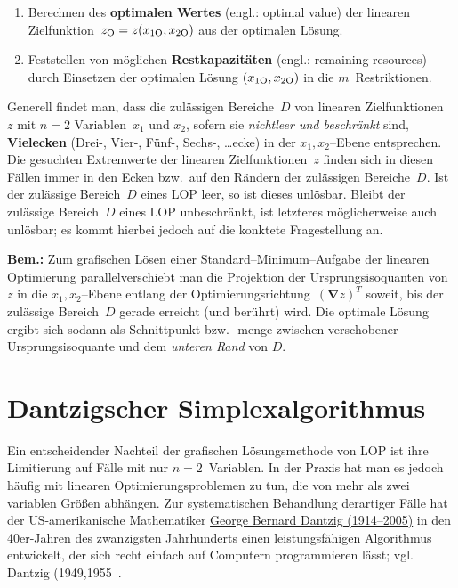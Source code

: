 \begin{enumerate}
\item Berechnen des {\bf optimalen Wertes} (engl.: optimal value) 
der linearen Zielfunktion~$z_{{\rm O}}=z(x_{1{\rm O}},x_{2{\rm O}})$ aus der optimalen L\"osung.

\item Feststellen von m\"oglichen {\bf Restkapazit\"aten} (engl.: 
remaining resources) durch Einsetzen der optimalen L\"osung 
$(x_{1{\rm O}}, x_{2{\rm O}})$ in die $m$~Restriktionen.

\end{enumerate}
%
Generell findet man, dass die zul\"assigen Bereiche~$D$ von
linearen Zielfunktionen~$z$ mit $n=2$ Variablen~$x_{1}$ und
$x_{2}$, sofern sie {\em nichtleer und beschr\"ankt\/} sind,
{\bf Vielecken} (Drei-, Vier-, F\"unf-, Sechs-,
\ldots ecke) in der $x_{1},x_{2}$--Ebene entsprechen. Die
gesuchten Extremwerte der linearen Zielfunktionen~$z$ finden
sich in diesen F\"allen immer in den Ecken bzw.\ auf den
R\"andern der zul\"assigen Bereiche~$D$. Ist der zul\"assige
Bereich~$D$ eines LOP leer, so ist dieses unl\"osbar.
Bleibt der zul\"assige Bereich~$D$ eines LOP unbeschr\"ankt,
ist letzteres m\"oglicherweise auch unl\"osbar; es kommt
hierbei jedoch auf die konktete Fragestellung an.

\medskip
\noindent
\underline{\bf Bem.:} Zum grafischen L\"osen einer
Standard--Minimum--Aufgabe der linearen
Optimierung parallelverschiebt man die Projektion der
Ursprungsisoquanten von~$z$ in die $x_{1},x_{2}$--Ebene
entlang der Optimierungsrichtung~$(\boldsymbol{\nabla} z)^{T}$
soweit, bis der zul\"assige Bereich~$D$ gerade erreicht (und
ber\"uhrt) wird. Die optimale L\"osung ergibt sich sodann als
Schnittpunkt bzw. -menge zwischen verschobener
Ursprungsisoquante und dem {\em unteren Rand\/} von $D$.

\section[Dantzigscher Simplexalgorithmus]%
{Dantzigscher Simplexalgorithmus}
Ein entscheidender Nachteil der grafischen L\"osungsmethode von
LOP ist ihre Limitierung auf F\"alle mit nur $n=2$~Variablen.
In der Praxis hat man es jedoch h\"aufig mit linearen
Optimierungsproblemen zu tun, die von mehr als zwei variablen
Gr\"o\ss en abh\"angen. Zur systematischen Behandlung derartiger
F\"alle hat der US-amerikanische Mathematiker 
\href{http://www-groups.dcs.st-and.ac.uk/~history/Biographies/Dantzig_George.html}{George
Bernard Dantzig (1914--2005)} in den 40er-Jahren des zwanzigsten
Jahrhunderts einen leistungsf\"ahigen Algorithmus entwickelt, der
sich recht einfach auf Computern programmieren l\"asst; vgl. 
Dantzig (1949,1955~.

